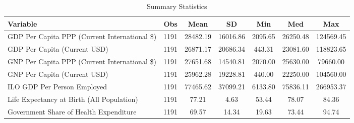 \begin{table}
\centering
\caption{Summary Statistics}
\label{Sum_Stats}
\begin{tabular}{lcccccc}
\toprule
                                    Variable &  Obs &     Mean &       SD &     Min &      Med &       Max \\
\midrule
GDP Per Capita PPP (Current International \$) & 1191 & 28482.19 & 16016.86 & 2095.65 & 26250.48 & 124569.45 \\
GDP Per Capita (Current USD) & 1191 & 26871.17 & 20686.34 & 443.31 & 23081.60 & 118823.65 \\
GNP Per Capita PPP (Current International \$) & 1191 & 27651.68 & 14540.81 & 2070.00 & 25630.00 & 79660.00 \\
GNP Per Capita (Current USD) & 1191 & 25962.28 & 19228.81 & 440.00 & 22250.00 & 104560.00 \\
ILO GDP Per Person Employed & 1191 & 77465.62 & 37099.21 & 6133.80 & 75836.11 & 266953.37 \\
Life Expectancy at Birth (All Population) & 1191 & 77.21 & 4.63 & 53.44 & 78.07 & 84.36 \\
Government Share of Health Expenditure & 1191 & 69.57 & 14.34 & 19.63 & 73.44 & 94.74 \\
\bottomrule
\end{tabular}
\end{table}
